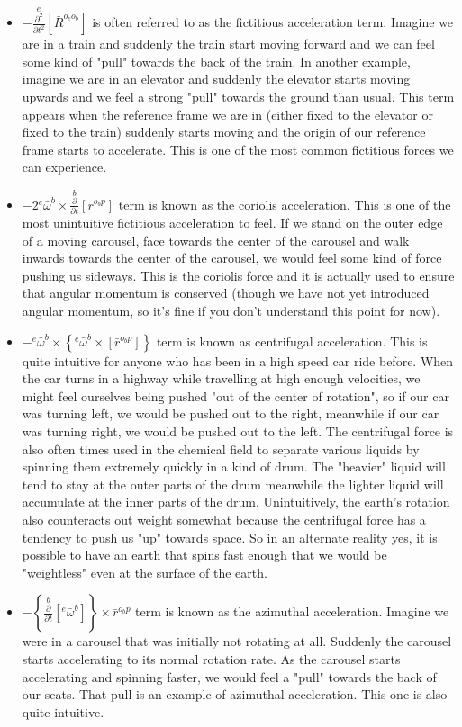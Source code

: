 \begin{itemize}
\item $\displaystyle   -  \overset{e}{\frac{\partial^{2}}{\partial t^{2}}}[\bar{R}^{o_{e}o_{b}}]$ is often referred to as the fictitious acceleration term. 
Imagine we are in a train and suddenly the train start moving forward and we can feel some kind of "pull" towards the back of the train.
In another example, imagine we are in an elevator and suddenly the elevator starts moving upwards and we feel a strong "pull" towards the ground than usual.
This term appears when the reference frame we are in (either fixed to the elevator or fixed to the train) suddenly starts moving and the origin of our reference frame starts to accelerate.
This is one of the most common fictitious forces we can experience.
\item $\displaystyle   -  2{}^{e}\bar{\omega}^{b}\times\overset{b}{\frac{\partial}{\partial t}}[\bar{r}^{o_{b}p}]$ term is known as the coriolis acceleration.
This is one of the most unintuitive fictitious acceleration to feel. 
If we stand on the outer edge of a moving carousel, face towards the center of the carousel and walk inwards towards the center of the carousel, we would feel some kind of force pushing us sideways.
This is the coriolis force and it is actually used to ensure that angular momentum is conserved (though we have not yet introduced angular momentum, so it's fine if you don't understand this point for now). 
\item $\displaystyle     -   {}^{e}\bar{\omega}^{b}\times\left\{{}^{e}\bar{\omega}^{b}\times\left[\bar{r}^{o_{b}p}\right]\right\}$ term is known as centrifugal acceleration.
This is quite intuitive for anyone who has been in a high speed car ride before. 
When the car turns in a highway while travelling at high enough velocities, we might feel ourselves being pushed "out of the center of rotation", so if our car was turning left, we would be pushed out to the right, meanwhile if our car was turning right, we would be pushed out to the left. 
The centrifugal force is also often times used in the chemical field to separate various liquids by spinning them extremely quickly in a kind of drum.
The "heavier" liquid will tend to stay at the outer parts of the drum meanwhile the lighter liquid will accumulate at the inner parts of the drum.
Unintuitively, the earth's rotation also counteracts out weight somewhat because the centrifugal force has a tendency to push us "up" towards space. 
So in an alternate reality yes, it is possible to have an earth that spins fast enough that we would be "weightless" even at the surface of the earth.
\item $\displaystyle   -    \left\{\overset{b}{\frac{\partial}{\partial t}}[{}^{e}\bar{\omega}^{b}]\right\}\times\bar{r}^{o_{b}p}$ term is known as the azimuthal acceleration. 
Imagine we were in a carousel that was initially not rotating at all.
Suddenly the carousel starts accelerating to its normal rotation rate. 
As the carousel starts accelerating and spinning faster, we would feel a "pull" towards the back of our seats. 
That pull is an example of azimuthal acceleration.
This one is also quite intuitive.
\end{itemize}
